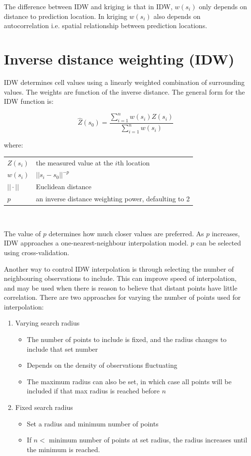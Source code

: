 \documentclass{article}
\makeatletter
\newenvironment{conditions}[1][where:] 
  {#1 \begin{tabular}[t]{>{$}l<{$} @{${}={}$} l}}
  {\end{tabular}\\[\belowdisplayskip]}
\makeatother
\begin{document}
The difference between IDW and kriging is that in IDW, $w(s_{i})$ only depends on distance to prediction location.
In kriging $w(s_{i})$ also depends on autocorrelation i.e. spatial relationship between prediction locations.

\section{Inverse distance weighting (IDW)}

IDW determines cell values using a linearly weighted combination of surrounding values.
The weights are function of the inverse distance.
The general form for the IDW function is:

\[\hat{Z}(s_{0})= \frac{\sum_{i=1}^{n} w(s_{i}) Z(s_{i})}{\sum_{i=1}^{n} w (s_{i})}\]

\begin{conditions}
    Z(s_{i}) & the measured value at the $i$th location \\
    w(s_{i}) & $||s_{i} - s_{0}||^{-p}$ \\
    || \cdot || & Euclidean distance \\
    p & an inverse distance weighting power, defaulting to 2
\end{conditions}

The value of $p$ determines how much closer values are preferred.
As $p$ increases, IDW approaches a one-nearest-neighbour interpolation model.
$p$ can be selected using cross-validation.

Another way to control IDW interpolation is through selecting the number of neighbouring observations to include.
This can improve speed of interpolation, and may be used when there is reason to believe that distant points have little correlation.
There are two approaches for varying the number of points used for interpolation:

\begin{enumerate}
    \item Varying search radius 
    \begin{itemize}
        \item The number of points to include is fixed, and the radius changes to include that set number
        \item Depends on the density of observations fluctuating
        \item The maximum radius can also be set, in which case all points will be included if that max radius is reached before $n$
    \end{itemize}
    \item Fixed search radius
    \begin{itemize}
        \item Set a radius and minimum number of points
        \item If $n <$ minimum number of points at set radius, the radius increases until the minimum is reached.
    \end{itemize}
\end{enumerate}
\end{document}
